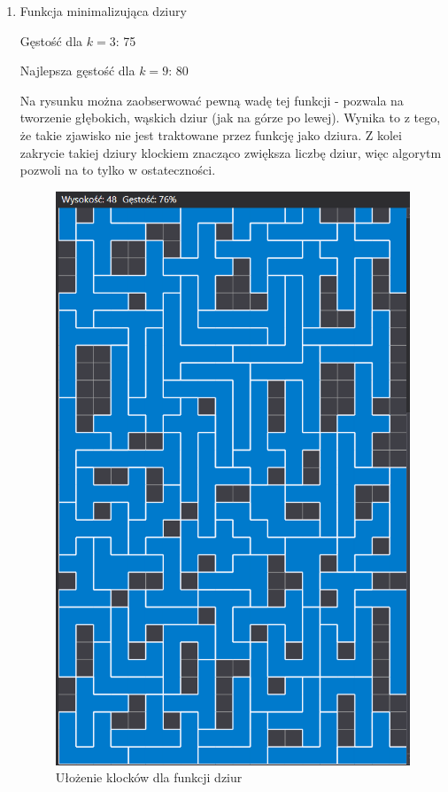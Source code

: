 \documentclass{article}
\begin{document}
\begin{enumerate}
\item Funkcja minimalizująca dziury

Gęstość dla $k=3$: 75

Najlepsza gęstość dla $k=9$: 80

Na rysunku można zaobserwować pewną wadę tej funkcji - pozwala na tworzenie głębokich, wąskich dziur (jak na górze po lewej). 
Wynika to z tego, że takie zjawisko nie jest traktowane przez funkcję jako dziura.
Z kolei zakrycie takiej dziury klockiem znacząco zwiększa liczbę dziur, więc algorytm pozwoli na to tylko w ostateczności.

\begin{figure}[H]
\includegraphics[width=\textwidth]{dziury.PNG}
\caption{Ułożenie klocków dla funkcji dziur}
\end{figure}


\end{enumerate}
\end{document}

